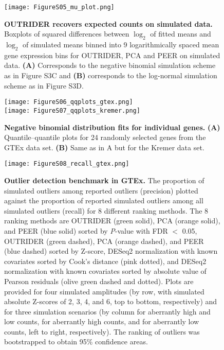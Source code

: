 \documentclass[a4paper,12pt]{article}
\begin{document}
\begin{figure}[h]
    \centering
    \texttt{[image: FigureS05\_mu\_plot.png]}
    \caption{\textbf{OUTRIDER recovers expected counts on simulated data.}
Boxplots of squared differences between $\log_2$ of fitted means and $\log_2$ of simulated means
binned into 9 logarithmically spaced mean gene expression bins for OUTRIDER, PCA and PEER on simulated data.
\textbf{(A)} Corresponds to the negative binomial simulation scheme as in Figure S3C and 
\textbf{(B)} corresponds to the log-normal simulation scheme as in Figure S3D.}
\end{figure}
\pagebreak


\begin{figure}[h]
    \centering
    \texttt{[image: FigureS06\_qqplots\_gtex.png]}
    \\
    \texttt{[image: FigureS07\_qqplots\_kremer.png]}
    \caption{\textbf{Negative binomial distribution fits for individual genes.}
\newline
\textbf{(A)} Quantile--quantile plots for 24 randomly selected genes from the GTEx data set.
\textbf{(B)} Same as in A but for the Kremer data set.}
\end{figure}
\pagebreak

\begin{figure}[h]
    \centering
    \texttt{[image: FigureS08\_recall\_gtex.png]}
    \caption{\textbf{Outlier detection benchmark in GTEx.}
The proportion of simulated outliers among reported outliers (precision) plotted against the proportion of reported simulated outliers among all simulated outliers (recall) for 8 different ranking methods. The 8 ranking methods are 
OUTRIDER (green solid), PCA (orange solid), and PEER (blue solid) sorted by \textit{P}-value with FDR $<$ 0.05, OUTRIDER (green dashed), PCA (orange dashed), and PEER (blue dashed) sorted by Z-score,
DESeq2 normalization with known covariates sorted by Cook's distance (pink dotted),
and DESeq2 normalization with known covariates sorted by absolute value of Pearson residuals (olive green dashed and dotted).
Plots are provided for four simulated amplitudes (by row, with simulated absolute Z-scores of 2, 3, 4, and 6, top to bottom, respectively) and for three simulation scenarios (by column for aberrantly high and low counts, for aberrantly high counts, and for aberrantly low counts, left to right, respectively). 
The ranking of outliers was bootstrapped to obtain 95\% confidence areas.}
\end{figure}
\pagebreak
\end{document}
